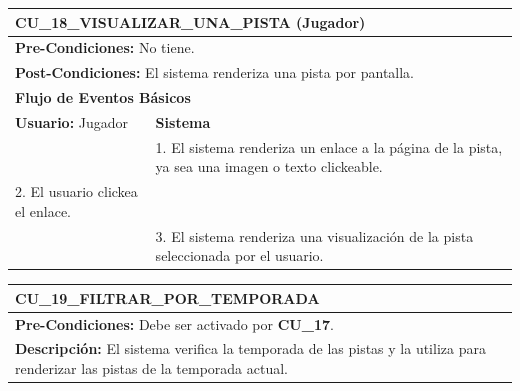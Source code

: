\begin{center}
  \begin{tabular}{| p{7.5cm} | p{7.5cm} |}
    \hline
    \multicolumn{2}{|p{15cm}|}{\textbf{CU\_18\_VISUALIZAR\_UNA\_PISTA} (Jugador)} \\ \hline
    \multicolumn{2}{|p{15cm}|}{\textbf{Pre-Condiciones:} No tiene.} \\ \hline
    \multicolumn{2}{|p{15cm}|}{\textbf{Post-Condiciones:} El sistema renderiza una pista por pantalla.} \\ \hline
    \multicolumn{2}{|p{7.5cm}|}{\textbf{Flujo de Eventos Básicos}} \\ \hline
    \multicolumn{1}{|p{7.5cm}|}{\textbf{Usuario:} Jugador} & \multicolumn{1}{|p{7.5cm}|}{\textbf{Sistema}} \\ \hline
    
    \multicolumn{1}{|p{7.5cm}|}{} & 
    \multicolumn{1}{|p{7.5cm}|}{1. El sistema renderiza un enlace a la página de la pista, ya sea una imagen o texto clickeable.}\\ \hline
    
    \multicolumn{1}{|p{7.5cm}|}{2. El usuario clickea el enlace.} & 
    \multicolumn{1}{|p{7.5cm}|}{}\\ \hline
    
    \multicolumn{1}{|p{7.5cm}|}{} & 
    \multicolumn{1}{|p{7.5cm}|}{3. El sistema renderiza una visualización de la pista seleccionada por el usuario.}\\ \hline
  \end{tabular}
\end{center}

\begin{center}
  \begin{tabular}{| p{7.5cm} | p{7.5cm} |}
    \hline
    \multicolumn{2}{|p{15cm}|}{\textbf{CU\_19\_FILTRAR\_POR\_TEMPORADA}} \\ \hline
    \multicolumn{2}{|p{15cm}|}{\textbf{Pre-Condiciones:} Debe ser activado por \textbf{CU\_17}.} \\ \hline
    \multicolumn{2}{|p{15cm}|}{\textbf{Descripción:} El sistema verifica la temporada de las pistas y la utiliza para renderizar las pistas de la temporada actual.} \\
    \hline
  \end{tabular}
\end{center}


